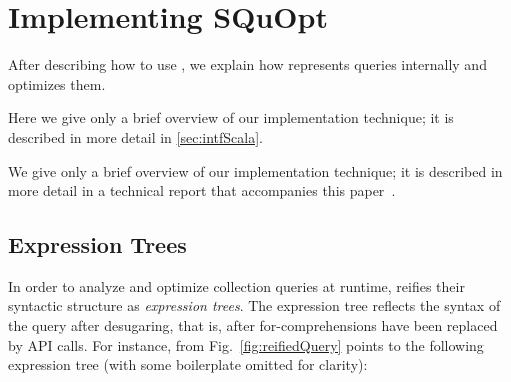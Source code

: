 


\chapter{Implementing SQuOpt}
\label{ch:aosd13-implementation}
\label{sec:implementation}

After describing how to use {\LoS}, we explain how \LoS{} represents queries internally and optimizes them.
\begin{techrep}
Here we give only a brief overview of our implementation technique; it is described in more detail
in \cref{sec:intfScala}.
\end{techrep}
\begin{nontechrep}
We give only a brief overview of our implementation technique; it is described in more detail
in a technical report that accompanies this paper~\citep{GiarrussoEtAl2012ReifyTR}.
\end{nontechrep}

\section{Expression Trees}
\label{sec:representation}
In order to analyze and optimize collection queries at runtime, {\LoS} reifies their syntactic structure as \emph{expression trees}.
The expression tree reflects the syntax of the query after desugaring, that is, after for-comprehensions have been replaced by API calls.
For instance,  from Fig.~\ref{fig:reifiedQuery} points to the
following expression tree (with some boilerplate omitted for clarity):

